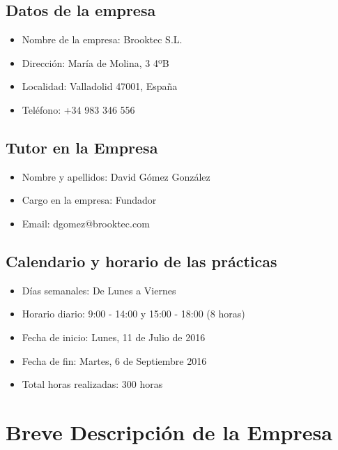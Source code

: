 \documentclass[10pt, a4paper,spanish]{article}
\begin{document}
        \subsection{Datos de la empresa}

            \begin{itemize}
              \item Nombre de la empresa: Brooktec S.L.
              \item Dirección:  María de Molina, 3 4ºB
              \item Localidad:  Valladolid 47001, España
              \item Teléfono:  +34 983 346 556
            \end{itemize}


        \subsection{Tutor en la Empresa}

            \begin{itemize}
              \item Nombre y apellidos: David Gómez González
              \item Cargo en la empresa: Fundador
              \item Email: dgomez@brooktec.com
            \end{itemize}


        \subsection{Calendario y horario de las prácticas}

            \begin{itemize}
              \item Días semanales: De Lunes a Viernes
              \item Horario diario: 9:00 - 14:00 y 15:00 - 18:00 (8 horas)
              \item Fecha de inicio: Lunes, 11 de Julio de 2016
              \item Fecha de fin:  Martes, 6 de Septiembre 2016
              \item Total horas realizadas: 300 horas
            \end{itemize}


    \section{Breve Descripción de la Empresa}
\end{document}
